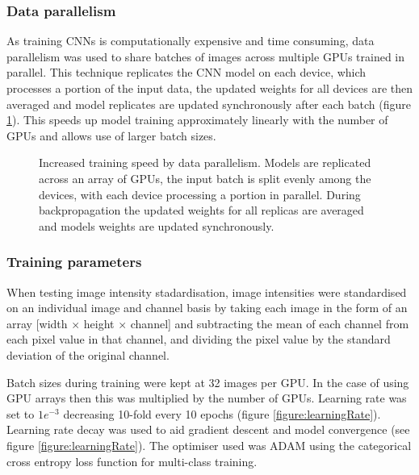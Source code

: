 \documentclass[a4paper,11pt,twoside,openright]{scrbook}
\begin{document}
\subsubsection{Data parallelism}
As training CNNs is computationally expensive and time consuming, data parallelism was used to share batches of images across multiple GPUs trained in parallel.
This technique replicates the CNN model on each device, which processes a portion of the input data, the updated weights for all devices are then averaged and model replicates are updated synchronously after each batch (figure \ref{figure:multi_GPU}).
This speeds up model training approximately linearly with the number of GPUs and allows use of larger batch sizes.

\begin{figure}
    \captionsetup{width=0.8\textwidth}
    \caption[Multi-GPU distributed training]{Increased training speed by data parallelism. Models are replicated across an array of GPUs, the input batch is split evenly among the devices, with each device processing a portion in parallel.
During backpropagation the updated weights for all replicas are averaged and models weights are updated synchronously.}
    
    \label{figure:multi_GPU}
\end{figure}


\subsubsection{Training parameters}

When testing image intensity stadardisation, image intensities were standardised on an individual image and channel basis by taking each image in the form of an array [width $\times$ height $\times$ channel] and subtracting the mean of each channel from each pixel value in that channel, and dividing the pixel value by the standard deviation of the original channel.

Batch sizes during training were kept at 32 images per GPU.
In the case of using GPU arrays then this was multiplied by the number of GPUs.
Learning rate was set to $1e^{-3}$ decreasing 10-fold every 10 epochs (figure \ref{figure:learningRate}).
Learning rate decay was used to aid gradient descent and model convergence (see figure \ref{figure:learningRate}).
The optimiser used was ADAM \cite{Kingma2014} using the categorical cross entropy loss function for multi-class training.
\end{document}
